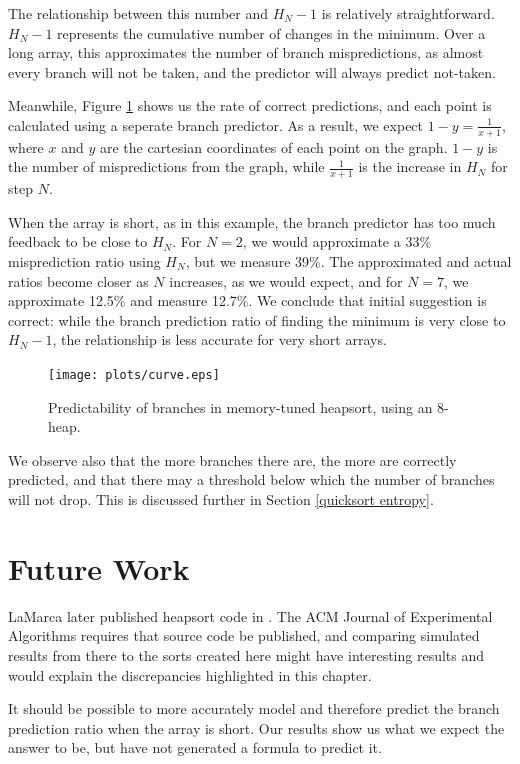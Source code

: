 The relationship between this number and $H_N-1$ is relatively straightforward.
$H_N-1$ represents the cumulative number of changes in the minimum. Over a long
array, this approximates the number of branch mispredictions, as almost every
branch will not be taken, and the predictor will always predict not-taken.

Meanwhile, Figure \ref{memory-tuned heapsort curve} shows us the rate of correct
predictions, and each point is calculated using a seperate branch predictor. As
a result, we expect $1-y = \frac{1}{x+1}$, where $x$ and $y$ are the cartesian
coordinates of each point on the graph.  $1-y$ is the number of mispredictions
from the graph, while $\frac{1}{x+1}$ is the increase in $H_N$ for step $N$.

When the array is short, as in this example, the branch predictor has too much
feedback to be close to $H_N$. For $N=2$, we would approximate a 33\%
misprediction ratio using $H_N$, but we measure 39\%. The approximated and
actual ratios become closer as $N$ increases, as we would expect, and for $N=7$,
we approximate 12.5\% and measure 12.7\%. We conclude that initial suggestion is
correct: while the branch prediction ratio of finding the minimum is very close
to $H_N-1$, the relationship is less accurate for very short arrays.


\begin{figure}
\texttt{[image: plots/curve.eps]}
\caption{Predictability of branches in memory-tuned heapsort, using an 8-heap.}
\label{memory-tuned heapsort curve}
\end{figure}

\label{heapsort entropy}
We observe also that the more branches there are, the more are correctly
predicted, and that there may a threshold below which the number of branches will
not drop. This is discussed further in Section \ref{quicksort entropy}.

\section{Future Work}

LaMarca later published heapsort code in \cite{LaMarcaHeap96}. The ACM
Journal of Experimental Algorithms requires that source code be published, and
comparing simulated results from there to the sorts created here might have
interesting results and would explain the discrepancies highlighted in this
chapter.

It should be possible to more accurately model and therefore predict the branch
prediction ratio when the array is short. Our results show us what we expect the
answer to be, but have not generated a formula to predict it.
